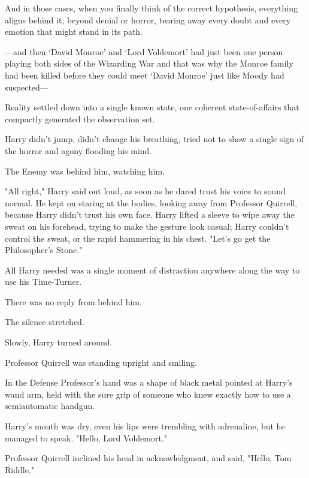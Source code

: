 And in those cases, when you finally think of the correct hypothesis,
everything aligns behind it, beyond denial or horror, tearing away every doubt
and every emotion that might stand in its path.

—and then `David Monroe' and `Lord Voldemort' had just been one person
playing both sides of the Wizarding War and that was why the Monroe family had
been killed before they could meet `David Monroe' just like Moody had
suspected—

Reality settled down into a single known state, one coherent state-of-affairs
that compactly generated the observation set.

Harry didn't jump, didn't change his breathing, tried not to show a single sign
of the horror and agony flooding his mind.

The Enemy was behind him, watching him.

"All right," Harry said out loud, as soon as he dared trust his voice to sound
normal. He kept on staring at the bodies, looking away from Professor Quirrell,
because Harry didn't trust his own face. Harry lifted a sleeve to wipe away the
sweat on his forehead, trying to make the gesture look casual; Harry couldn't
control the sweat, or the rapid hammering in his chest. "Let's go get the
Philosopher's Stone."

All Harry needed was a single moment of distraction anywhere along the way to
use his Time-Turner.

There was no reply from behind him.

The silence stretched.

Slowly, Harry turned around.

Professor Quirrell was standing upright and smiling.

In the Defense Professor's hand was a shape of black metal pointed at Harry's
wand arm, held with the sure grip of someone who knew exactly how to use a
semiautomatic handgun.

Harry's mouth was dry, even his lips were trembling with adrenaline, but he
managed to speak. "Hello, Lord Voldemort."

Professor Quirrell inclined his head in acknowledgment, and said, "Hello, Tom
Riddle."
